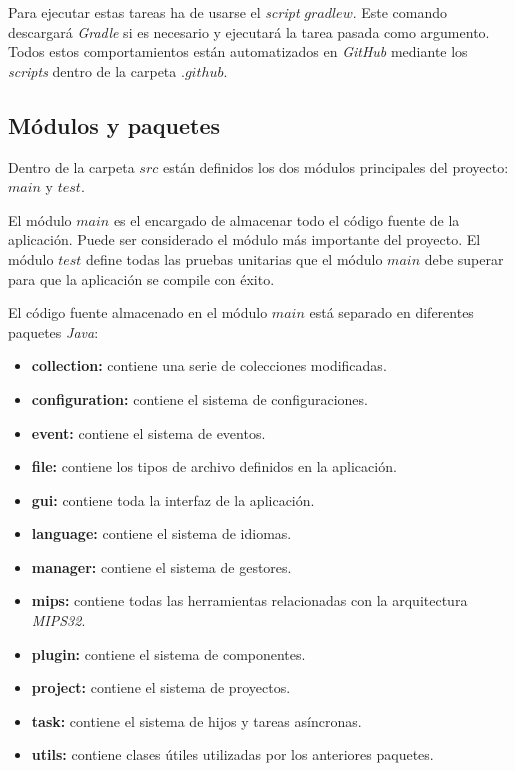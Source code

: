 Para ejecutar estas tareas ha de usarse el \textit{script} $gradlew$.
Este comando descargará \textit{Gradle} si es necesario y ejecutará
la tarea pasada como argumento.
Todos estos comportamientos están automatizados en \textit{GitHub}
mediante los \textit{scripts} dentro de la carpeta $.github$.

\subsection{Módulos y paquetes}\label{subsec:modulos-y-paquetes}

Dentro de la carpeta $src$ están definidos los dos módulos principales del
proyecto: $main$ y $test$.

El módulo $main$ es el encargado de almacenar todo el código fuente
de la aplicación.
Puede ser considerado el módulo más importante del proyecto.
El módulo $test$ define todas las pruebas unitarias que el módulo $main$
debe superar para que la aplicación se compile con éxito.

El código fuente almacenado en el módulo $main$ está separado en diferentes
paquetes \textit{Java}:
\begin{itemize}
    \item \textbf{collection:} contiene una serie de colecciones modificadas.
    \item \textbf{configuration:} contiene el sistema de configuraciones.
    \item \textbf{event:} contiene el sistema de eventos.
    \item \textbf{file:} contiene los tipos de archivo definidos en la aplicación.
    \item \textbf{gui:} contiene toda la interfaz de la aplicación.
    \item \textbf{language:} contiene el sistema de idiomas.
    \item \textbf{manager:} contiene el sistema de gestores.
    \item \textbf{mips:} contiene todas las herramientas relacionadas con la arquitectura \textit{MIPS32}.
    \item \textbf{plugin:} contiene el sistema de componentes.
    \item \textbf{project:} contiene el sistema de proyectos.
    \item \textbf{task:} contiene el sistema de hijos y tareas asíncronas.
    \item \textbf{utils:} contiene clases útiles utilizadas por los anteriores paquetes.
\end{itemize}


